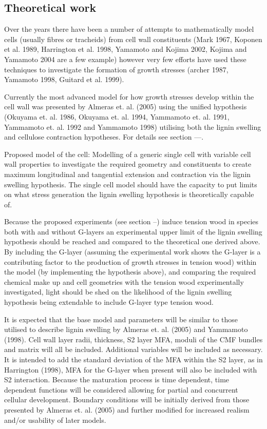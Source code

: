 \documentclass{article}
\begin{document}
\subsection{Theoretical work}
Over the years there have been a number of attempts to mathematically model
cells (usually fibres or tracheids) from cell wall constituents (Mark
1967, Koponen et al. 1989, Harrington et al. 1998, Yamamoto and Kojima 2002,
Kojima and Yamamoto 2004 are a few example) however very few efforts have used
these techniques to investigate the formation of growth stresses (archer 1987,
Yamamoto 1998, Guitard et al. 1999).

Currently the most advanced model for how growth stresses develop within the
cell wall was presented by Almeras et. al. (2005) using the unified hypothesis
(Okuyama et. al. 1986, Okuyama et. al. 1994, Yammamoto et. al. 1991, Yammamoto
et. al. 1992 and Yammamoto 1998) utilising both the lignin swelling and
cellulose contraction hypotheses. For details see section ---.

Proposed model of the cell:
Modelling of a generic single cell with variable cell wall properties to
investigate the required geometry and constituents to create maximum
longitudinal and tangential extension and contraction via the lignin swelling
hypothesis. The single cell model should have the capacity to put limits on what
stress generation the lignin swelling hypothesis is theoretically capable of.

Because the proposed experiments (see section --) induce tension wood in species
both with and without G-layers an experimental upper limit of the lignin
swelling hypothesis should be reached and compared to the theoretical one
derived above. By including the G-layer (assuming the experimental work shows
the G-layer is a contributing factor to the production of growth stresses in
tension wood) within the model (by implementing the hypothesis above), and
comparing the required chemical make up and cell geometries with the
tension wood experimentally investigated, light should be shed on the likelihood
of the lignin swelling hypothesis being extendable to include G-layer type
tension wood.

It is expected that the base model and parameters will be similar to
those utilised to describe lignin swelling by Almeras  et. al. (2005) and
Yammamoto (1998). Cell wall layer radii, thickness, S2 layer MFA, moduli of
the CMF bundles and matrix will all be included. Additional variables will
be included as necessary. It is intended to add the standard deviation of the
MFA within the S2 layer, as in Harrington (1998), MFA for the G-layer when
present will also be included with S2 interaction. Because the
maturation process is time dependent, time dependent functions will be
considered allowing for partial and concurrent cellular development. Boundary
conditions will be initially derived from those presented by Almeras et. al.
(2005) and further modified for increased realism and/or usability of later
models.
\end{document}
